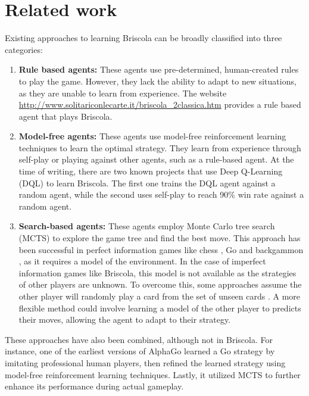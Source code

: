 \section{Related work}
Existing approaches to learning Briscola can be broadly classified into three categories:
\begin{enumerate}
    \item \textbf{Rule based agents:} These agents use pre-determined, human-created rules to play the game. However, they lack the ability to adapt to new situations, as they are unable to learn from experience. The website \url{http://www.solitariconlecarte.it/briscola_2classica.htm} provides a rule based agent that plays Briscola.
    \item \textbf{Model-free agents:} These agents use model-free reinforcement learning techniques to learn the optimal strategy. They learn from experience through self-play or playing against other agents, such as a rule-based agent. At the time of writing, there are two known projects that use Deep Q-Learning (DQL) \cite{mnih2013playing} to learn Briscola. The first one \cite{fezriva-briscola-dqn} trains the DQL agent against a random agent, while the second \cite{alsora-deep-briscola-dqn} uses self-play to reach 90\% win rate against a random agent.
    \item \textbf{Search-based agents:} These agents employ Monte Carlo tree search (MCTS) to explore the game tree and find the best move. This approach has been successful in perfect information games like chess \cite{alphazero}, Go \cite{alphagozero} and backgammon \cite{td-gammon}, as it requires a model of the environment. In the case of imperfect information games like Briscola, this model is not available as the strategies of other players are unknown. To overcome this, some approaches assume the other player will randomly play a card from the set of unseen cards \cite{Briscola-mcts-Playing-Algorithm}. A more flexible method could involve learning a model of the other player to predicts their moves, allowing the agent to adapt to their strategy.
\end{enumerate}
These approaches have also been combined, although not in Briscola. For instance, one of the earliest versions of AlphaGo \cite{alphago-fan} learned a Go strategy by imitating professional human players, then refined the learned strategy using model-free reinforcement learning techniques. Lastly, it utilized MCTS to further enhance its performance during actual gameplay.\\\\
